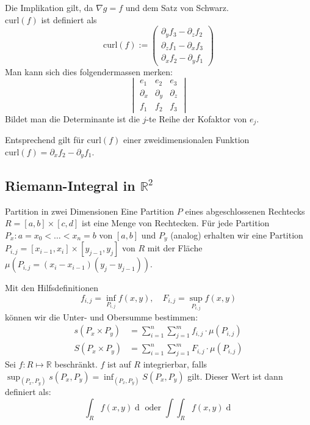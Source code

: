 \documentclass[a4paper,10pt]{article}
\def\R{\mathbb{R}}
\begin{document}
 Die Implikation gilt, da $\nabla g = f$ und dem Satz von Schwarz.\\
\(\text{curl}(f)\) ist definiert als
\[\text{curl}(f) := \begin{pmatrix}
  \partial_y f_3 - \partial_z f_2 \\
  \partial_z f_1 - \partial_x f_3 \\
  \partial_x f_2 - \partial_y f_1
\end{pmatrix}\]
Man kann sich dies folgendermassen merken:\\
$$\begin{vmatrix}
  e_1 & e_2 & e_3\\
  \partial_x & \partial_y & \partial_z\\
  f_1 & f_2 & f_3
\end{vmatrix}$$
Bildet man die Determinante ist die $j$-te Reihe der Kofaktor von $e_j$.

Entsprechend gilt für $\text{curl}(f)$ einer zweidimensionalen Funktion $\text{curl}(f) = \partial_x f_2 - \partial_y f_1$.

\subsection{Riemann-Integral in \texorpdfstring{\(\R^2\)}{R²}}
\begin{subbox}{Partition in zwei Dimensionen}
  Eine Partition \(P\) eines abgeschlossenen Rechtecks \(R = \left[a,b\right] \times \left[c,d\right]\) ist eine Menge von Rechtecken. Für jede Partition \(P_x : a = x_0 < \ldots < x_n = b\) von \(\left[a,b\right]\) und \(P_y\) (analog) erhalten wir eine Partition \(P_{i,j} = \left[x_{i-1}, x_i\right] \times \left[y_{j-1},y_j\right]\) von \(R\) mit der Fläche \(\mu({P_{i,j}} = (x_i - x_{i-1})(y_j - y_{j-1}))\).
\end{subbox}
Mit den Hilfsdefinitionen
\[f_{i,j} = \inf_{P_{i,j}} f(x,y), \quad F_{i,j} = \sup_{P_{i,j}} f(x,y)\]
können wir die Unter- und Obersumme bestimmen:
\begin{align*}
  s(P_x \times P_y) &= \sum_{i=1}^n \sum_{j=1}^m f_{i,j} \cdot \mu(P_{i,j}) \\
  S(P_x \times P_y) &= \sum_{i=1}^n \sum_{j=1}^m F_{i,j} \cdot \mu(P_{i,j})
\end{align*}
Sei \(f: R \mapsto \R\) beschränkt. \(f\) ist auf \(R\) integrierbar, falls \(\sup_{(P_x, P_y)} s(P_x, P_y) = \inf_{(P_x, P_y)} S(P_x, P_y)\) gilt. Dieser Wert ist dann definiert als:
\[\int_R f(x,y) \mathop{d(x,y)} \text{ oder } \int\int_R f(x,y) \mathop{d(x,y)}\]
\end{document}
